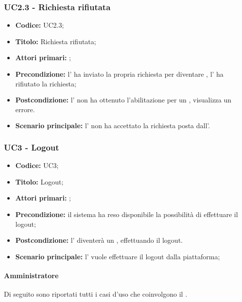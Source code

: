 \documentclass[casi-duso]{subfiles}
\begin{document}
\subsubsection{UC2.3 - Richiesta rifiutata}
\label{subsub:UC2.3}

\begin{itemize}
  \item \textbf{Codice:} UC2.3;
  \item \textbf{Titolo:} Richiesta rifiutata;
  \item \textbf{Attori primari:} ;
  \item \textbf{Precondizione:} l' ha inviato la propria richiesta per diventare , l' ha rifiutato la richiesta;
  \item \textbf{Postcondizione:} l' non ha ottenuto l'abilitazione per un , visualizza un errore.
  \item \textbf{Scenario principale:} l' non ha accettato la richiesta posta dall'.
\end{itemize}


\subsubsection{UC3 - Logout}
\label{subsub:UC3}

\begin{itemize}
  \item \textbf{Codice:} UC3;
  \item \textbf{Titolo:} Logout;
  \item \textbf{Attori primari:} ;
  \item \textbf{Precondizione:} il sistema ha reso disponibile la possibilità di effettuare il logout;
  \item \textbf{Postcondizione:} l' diventerà un , effettuando il logout.
  \item \textbf{Scenario principale:} l' vuole effettuare il logout dalla piattaforma;
\end{itemize}



\paragraph{Amministratore}
\label{par:amministratore}
Di seguito sono riportati tutti i casi d'uso che coinvolgono il  .
\end{document}
